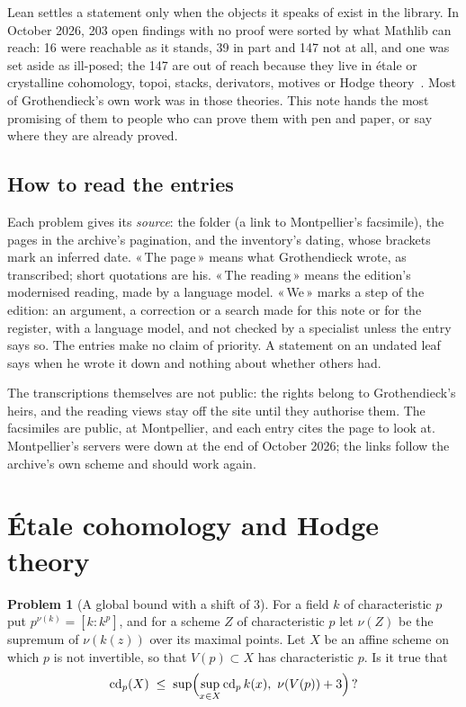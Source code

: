 \documentclass[11pt]{article}
\newcommand{\q}[1]{«\,#1\,»}
\newcommand{\cd}{\operatorname{cd}}
\theoremstyle{definition}
\newtheorem{problem}{Problem}
\theoremstyle{plain}\newtheorem*{proposition}{Proposition}\theoremstyle{definition}
\begin{document}
Lean settles a statement only when the objects it speaks of exist in the library. In October 2026, 203 open findings with no proof were sorted by what Mathlib can reach: 16 were reachable as it stands, 39 in part and 147 not at all, and one was set aside as ill-posed; the 147 are out of reach because they live in étale or crystalline cohomology, topoi, stacks, derivators, motives or Hodge theory~\cite{huacicm}. Most of Grothendieck's own work was in those theories. This note hands the most promising of them to people who can prove them with pen and paper, or say where they are already proved.

\subsection*{How to read the entries}

Each problem gives its \emph{source}: the folder (a link to Montpellier's facsimile), the pages in the archive's pagination, and the inventory's dating, whose brackets mark an inferred date. \q{The page} means what Grothendieck wrote, as transcribed; short quotations are his. \q{The reading} means the edition's modernised reading, made by a language model. \q{We} marks a step of the edition: an argument, a correction or a search made for this note or for the register, with a language model, and not checked by a specialist unless the entry says so. The entries make no claim of priority. A statement on an undated leaf says when he wrote it down and nothing about whether others had.

The transcriptions themselves are not public: the rights belong to Grothendieck's heirs, and the reading views stay off the site until they authorise them. The facsimiles are public, at Montpellier, and each entry cites the page to look at. Montpellier's servers were down at the end of October 2026; the links follow the archive's own scheme and should work again.

\section{Étale cohomology and Hodge theory}

\begin{problem}[A global bound with a shift of 3]\label{p:cd}
For a field $k$ of characteristic $p$ put $p^{\nu(k)} = [k : k^{p}]$, and for a scheme $Z$ of characteristic $p$ let $\nu(Z)$ be the supremum of $\nu(k(z))$ over its maximal points. Let $X$ be an affine scheme on which $p$ is not invertible, so that $V(p) \subset X$ has characteristic $p$. Is it true that
\[
\cd_p(X) \;\le\; \sup\Bigl(\sup_{x \in X} \cd_p k(x),\ \nu(V(p)) + 3\Bigr)\,?
\]
\end{problem}
\end{document}
